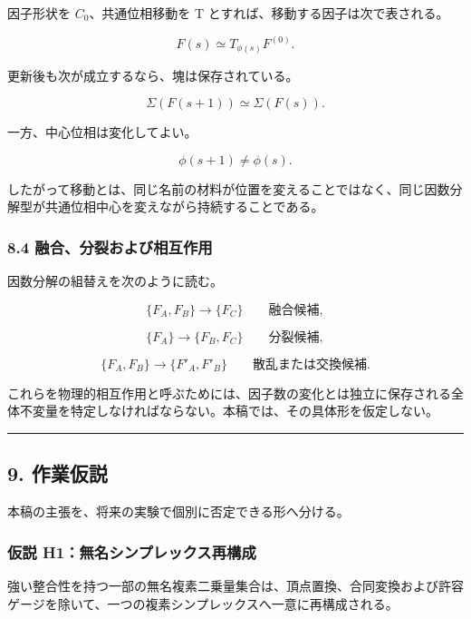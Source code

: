\documentclass[
  a4paper,
]{ltjsarticle}
\begin{document}
因子形状を \(C_0\)、共通位相移動を T
とすれば、移動する因子は次で表される。

\[
F(s)
\simeq
T_{\phi(s)}F^{(0)}.
\]

更新後も次が成立するなら、塊は保存されている。

\[
\Sigma(F(s+1))
\simeq
\Sigma(F(s)).
\]

一方、中心位相は変化してよい。

\[
\phi(s+1)
\neq
\phi(s).
\]

したがって移動とは、同じ名前の材料が位置を変えることではなく、同じ因数分解型が共通位相中心を変えながら持続することである。

\subsubsection{8.4
融合、分裂および相互作用}\label{ux878dux5408ux5206ux88c2ux304aux3088ux3073ux76f8ux4e92ux4f5cux7528}

因数分解の組替えを次のように読む。

\[
\{F_A,F_B\}
\longrightarrow
\{F_C\}
\qquad
\text{融合候補},
\]

\[
\{F_A\}
\longrightarrow
\{F_B,F_C\}
\qquad
\text{分裂候補},
\]

\[
\{F_A,F_B\}
\longrightarrow
\{F'_A,F'_B\}
\qquad
\text{散乱または交換候補}.
\]

これらを物理的相互作用と呼ぶためには、因子数の変化とは独立に保存される全体不変量を特定しなければならない。本稿では、その具体形を仮定しない。

\begin{center}\rule{0.5\linewidth}{0.5pt}\end{center}

\subsection{9. 作業仮説}\label{ux4f5cux696dux4eeeux8aac}

本稿の主張を、将来の実験で個別に否定できる形へ分ける。

\subsubsection{仮説
H1：無名シンプレックス再構成}\label{ux4eeeux8aac-h1ux7121ux540dux30b7ux30f3ux30d7ux30ecux30c3ux30afux30b9ux518dux69cbux6210}

強い整合性を持つ一部の無名複素二乗量集合は、頂点置換、合同変換および許容ゲージを除いて、一つの複素シンプレックスへ一意に再構成される。
\end{document}
